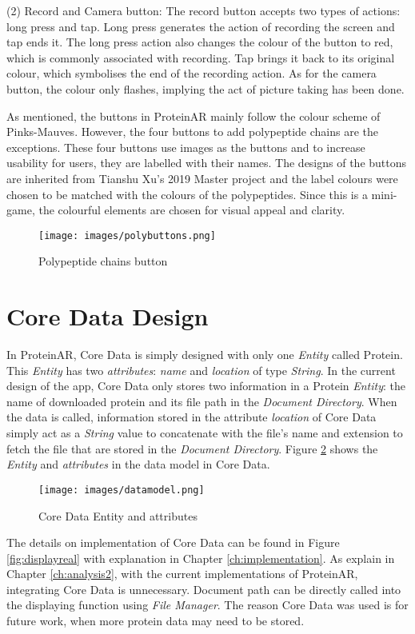 (2) Record and Camera button: The record button accepts two types of actions: long press and tap. Long press generates the action of recording the screen and tap ends it. The long press action also changes the colour of the button to red, which is commonly associated with recording. Tap brings it back to its original colour, which symbolises the end of the recording action. As for the camera button, the colour only flashes, implying the act of picture taking has been done. 

As mentioned, the buttons in ProteinAR mainly follow the colour scheme of Pinks-Mauves. However, the four buttons to add polypeptide chains are the exceptions. These four buttons use images as the buttons and to increase usability for users, they are labelled with their names. The designs of the buttons are inherited from Tianshu Xu’s 2019 Master project \parencite{xu_interactive_2019} and the label colours were chosen to be matched with the colours of the polypeptides. Since this is a mini-game, the colourful elements are chosen for visual appeal and clarity. 
\begin{figure}[hbt!]
	\centering
	\texttt{[image: images/polybuttons.png]}
	\caption{Polypeptide chains button}
	\label{fig:polybuttons}
\end{figure}

\section{Core Data Design}
In ProteinAR, Core Data is simply designed with only one \emph{Entity} called Protein. This \emph{Entity} has two \emph{attributes}: \emph{name} and \emph{location} of type \emph{String}. In the current design of the app, Core Data only stores two information in a Protein \emph{Entity}: the name of downloaded protein and its file path in the \emph{Document Directory}. When the data is called, information stored in the attribute \emph{location} of Core Data simply act as a \emph{String} value to concatenate with the file's name and extension to fetch the file that are stored in the \emph{Document Directory}. 
Figure \ref{fig:datamodel} shows the \emph{Entity} and \emph{attributes} in the data model in Core Data.
 \begin{figure}[!htp]
	\centering
	\texttt{[image: images/datamodel.png]}
	\caption{Core Data Entity and attributes}
	\label{fig:datamodel}
\end{figure}

The details on implementation of Core Data can be found in Figure \ref{fig:displayreal} with explanation in Chapter \ref{ch:implementation}. As explain in Chapter \ref{ch:analysis2}, with the current implementations of ProteinAR, integrating Core Data is unnecessary. Document path can be directly called into the displaying function using \emph{File Manager}. The reason Core Data was used is for future work, when more protein data may need to be stored. 




